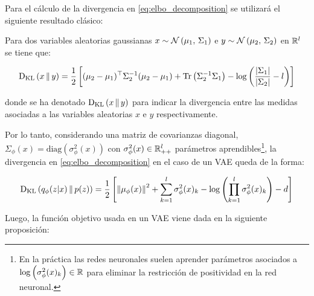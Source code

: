 
Para el cálculo de la divergencia en \eqref{eq:elbo_decomposition} se utilizará el siguiente resultado clásico:

\begin{teo}
    \label{teo:kl_gaussians}

    Para dos variables aleatorias gaussianas $x\sim\mathcal{N}\left(\mu_1,\,\Sigma_1\right)$ e $y\sim\mathcal{N}\left(\mu_2,\,\Sigma_2\right)$ en $\mathbb{R}^l$ se tiene que:

    \begin{equation*}
        \operatorname{D_{KL}}\left(x\,\|\,y\right) = \frac{1}{2}\left[(\mu_2-\mu_1)^\top\Sigma_2^{-1}(\mu_2-\mu_1) + \operatorname{Tr}\left(\Sigma_2^{-1}\Sigma_1\right) - \log\left(\frac{|\Sigma_1|}{|\Sigma_2|}-l\right)\right]
    \end{equation*}

    donde se ha denotado $\operatorname{D_{KL}}\left(x\,\|\,y\right)$ para indicar la divergencia entre las medidas asociadas a las variables aleatorias $x$ e $y$ respectivamente.
\end{teo}

Por lo tanto, considerando una matriz de covarianzas diagonal, $\Sigma_\phi(x) = \text{diag}(\sigma_\phi^2(x))$ con $\sigma_\phi^2(x)\in\mathbb{R}^l_{++}$ parámetros aprendibles\footnote{En la práctica las redes neuronales suelen aprender parámetros asociados a $\log\left(\sigma_\phi^2(x)_k\right)\in\mathbb{R}$ para eliminar la restricción de positividad en la red neuronal.}, la divergencia en \eqref{eq:elbo_decomposition} en el caso de un VAE queda de la forma:

\begin{equation*}
    \operatorname{D_{KL}}\left(q_\phi(z|x)\,\|\,p(z)\right)
    = \frac{1}{2}\left[
        \left\lVert \mu_\phi(x) \right\rVert^2 + \sum_{k=1}^l \sigma_\phi^2(x)_k
        - \log\left(\prod_{k=1}^l \sigma_\phi^2(x)_k\right)-d\right]
\end{equation*}

Luego, la función objetivo usada en un VAE viene dada en la siguiente proposición:

